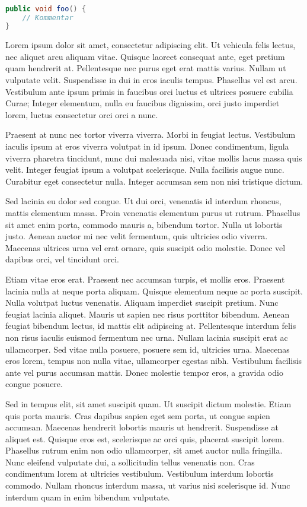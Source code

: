 \documentclass[12pt,oneside,a4paper,parskip]{scrbook}
\begin{document}
\begin{lstlisting}[label=lst:java,
				   language=java,
				   firstnumber=1,
				   caption=Beispiel für einen Quelltext]

public void foo() {
	// Kommentar
}
\end{lstlisting}

Lorem ipsum dolor sit amet, consectetur adipiscing elit. Ut vehicula felis lectus, nec aliquet arcu aliquam vitae. Quisque laoreet consequat ante, eget pretium quam hendrerit at. Pellentesque nec purus eget erat mattis varius. Nullam ut vulputate velit. Suspendisse in dui in eros iaculis tempus. Phasellus vel est arcu. Vestibulum ante ipsum primis in faucibus orci luctus et ultrices posuere cubilia Curae; Integer elementum, nulla eu faucibus dignissim, orci justo imperdiet lorem, luctus consectetur orci orci a nunc.

Praesent at nunc nec tortor viverra viverra. Morbi in feugiat lectus. Vestibulum iaculis ipsum at eros viverra volutpat in id ipsum. Donec condimentum, ligula viverra pharetra tincidunt, nunc dui malesuada nisi, vitae mollis lacus massa quis velit. Integer feugiat ipsum a volutpat scelerisque. Nulla facilisis augue nunc. Curabitur eget consectetur nulla. Integer accumsan sem non nisi tristique dictum.

Sed lacinia eu dolor sed congue. Ut dui orci, venenatis id interdum rhoncus, mattis elementum massa. Proin venenatis elementum purus ut rutrum. Phasellus sit amet enim porta, commodo mauris a, bibendum tortor. Nulla ut lobortis justo. Aenean auctor mi nec velit fermentum, quis ultricies odio viverra. Maecenas ultrices urna vel erat ornare, quis suscipit odio molestie. Donec vel dapibus orci, vel tincidunt orci.

Etiam vitae eros erat. Praesent nec accumsan turpis, et mollis eros. Praesent lacinia nulla at neque porta aliquam. Quisque elementum neque ac porta suscipit. Nulla volutpat luctus venenatis. Aliquam imperdiet suscipit pretium. Nunc feugiat lacinia aliquet. Mauris ut sapien nec risus porttitor bibendum. Aenean feugiat bibendum lectus, id mattis elit adipiscing at. Pellentesque interdum felis non risus iaculis euismod fermentum nec urna. Nullam lacinia suscipit erat ac ullamcorper. Sed vitae nulla posuere, posuere sem id, ultricies urna. Maecenas eros lorem, tempus non nulla vitae, ullamcorper egestas nibh. Vestibulum facilisis ante vel purus accumsan mattis. Donec molestie tempor eros, a gravida odio congue posuere.

Sed in tempus elit, sit amet suscipit quam. Ut suscipit dictum molestie. Etiam quis porta mauris. Cras dapibus sapien eget sem porta, ut congue sapien accumsan. Maecenas hendrerit lobortis mauris ut hendrerit. Suspendisse at aliquet est. Quisque eros est, scelerisque ac orci quis, placerat suscipit lorem. Phasellus rutrum enim non odio ullamcorper, sit amet auctor nulla fringilla. Nunc eleifend vulputate dui, a sollicitudin tellus venenatis non. Cras condimentum lorem at ultricies vestibulum. Vestibulum interdum lobortis commodo. Nullam rhoncus interdum massa, ut varius nisi scelerisque id. Nunc interdum quam in enim bibendum vulputate.
\end{document}
